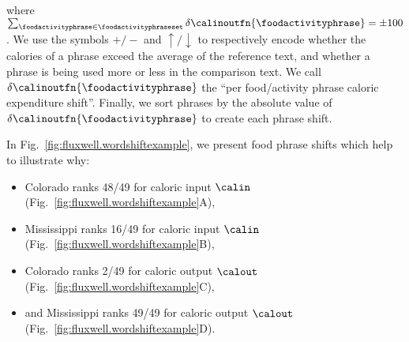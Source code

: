where $\sum_{\foodactivityphrase \in \foodactivityphraseset} 
\delta \calinoutfn{\foodactivityphrase} = \pm 100$.
We use the symbols $+/-$ and $\uparrow/\downarrow$ 
to respectively encode 
whether the calories of a phrase exceed the average
of the reference text,
and whether a phrase is being used more or less
in the comparison text.
We call $\delta \calinoutfn{\foodactivityphrase}$ the 
``per food/activity phrase caloric expenditure shift''.
Finally, we sort phrases by the absolute value of 
$\delta \calinoutfn{\foodactivityphrase}$ to
create each phrase shift.



In Fig.~\ref{fig:fluxwell.wordshiftexample}, we present 
food phrase shifts which help to illustrate why:
\begin{itemize}
\item 
  Colorado ranks 48/49 for caloric input $\calin$
  (Fig.~\ref{fig:fluxwell.wordshiftexample}A),
\item 
  Mississippi ranks 16/49 for caloric input $\calin$
  (Fig.~\ref{fig:fluxwell.wordshiftexample}B),
\item 
  Colorado ranks 2/49 for caloric output $\calout$
  (Fig.~\ref{fig:fluxwell.wordshiftexample}C),
\item 
  and Mississippi ranks 49/49 for caloric output  $\calout$
  (Fig.~\ref{fig:fluxwell.wordshiftexample}D).
\end{itemize}


